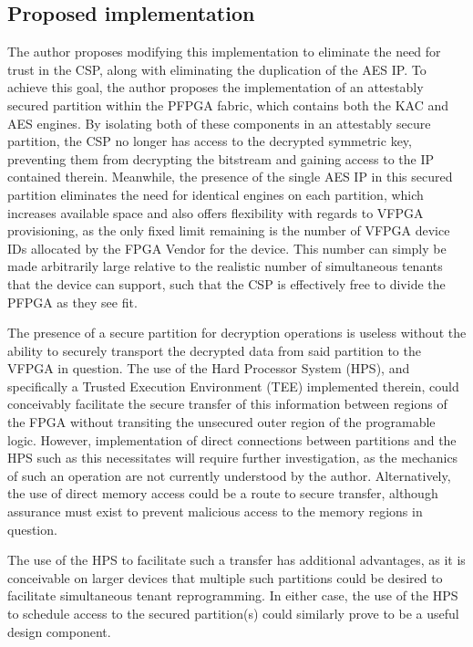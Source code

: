 \subsection{Proposed implementation}\label{subsec:Proposal}
The author proposes modifying this implementation to eliminate the need for trust in the CSP, along with eliminating the duplication of the AES IP. To achieve this goal, the author proposes the implementation of an attestably secured partition within the PFPGA fabric, which contains both the KAC and AES engines. By isolating both of these components in an attestably secure partition, the CSP no longer has access to the decrypted symmetric key, preventing them from decrypting the bitstream and gaining access to the IP contained therein. Meanwhile, the presence of the single AES IP in this secured partition eliminates the need for identical engines on each partition, which increases available space and also offers flexibility with regards to VFPGA provisioning, as the only fixed limit remaining is the number of VFPGA device IDs allocated by the FPGA Vendor for the device. This number can simply be made arbitrarily large relative to the realistic number of simultaneous tenants that the device can support, such that the CSP is effectively free to divide the PFPGA as they see fit.

The presence of a secure partition for decryption operations is useless without the ability to securely transport the decrypted data from said partition to the VFPGA in question. The use of the Hard Processor System (HPS), and specifically a Trusted Execution Environment (TEE) implemented therein, could conceivably facilitate the secure transfer of this information between regions of the FPGA without transiting the unsecured outer region of the programable logic. However, implementation of direct connections between partitions and the HPS such as this necessitates will require further investigation, as the mechanics of such an operation are not currently understood by the author. Alternatively, the use of direct memory access could be a route to secure transfer, although assurance must exist to prevent malicious access to the memory regions in question.

The use of the HPS to facilitate such a transfer has additional advantages, as it is conceivable on larger devices that multiple such partitions could be desired to facilitate simultaneous tenant reprogramming. In either case, the use of the HPS to schedule access to the secured partition(s) could similarly prove to be a useful design component.

